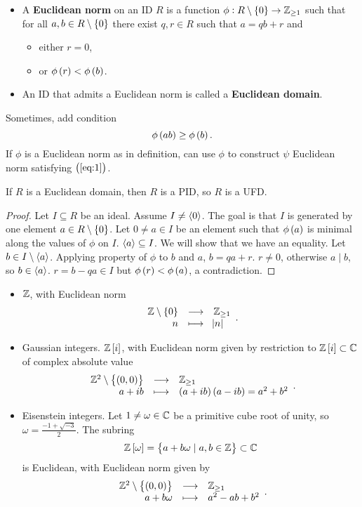 \begin{definition}
\hfill
\begin{itemize}
\item A \textbf{Euclidean norm} on an ID $ R $ is a function $ \phi : R \setminus \cbr{0} \to \Z_{\ge 1} $ such that for all $ a, b \in R \setminus \cbr{0} $ there exist $ q, r \in R $ such that $ a = qb + r $ and
\begin{itemize}
\item either $ r = 0 $,
\item or $ \phi\br{r} < \phi\br{b} $.
\end{itemize}
\item An ID that admits a Euclidean norm is called a \textbf{Euclidean domain}.
\end{itemize}
\end{definition}

Sometimes, add condition
\begin{equation}
\label{eq:1}
\phi\br{ab} \ge \phi\br{b}.
\end{equation}
If $ \phi $ is a Euclidean norm as in definition, can use $ \phi $ to construct $ \psi $ Euclidean norm satisfying $ \br{\ref{eq:1}} $.

\begin{theorem}
If $ R $ is a Euclidean domain, then $ R $ is a PID, so $ R $ is a UFD.
\end{theorem}


\begin{proof}
Let $ I \subseteq R $ be an ideal. Assume $ I \ne \left\langle 0 \right\rangle $. The goal is that $ I $ is generated by one element $ a \in R \setminus \cbr{0} $. Let $ 0 \ne a \in I $ be an element such that $ \phi\br{a} $ is minimal along the values of $ \phi $ on $ I $. $ \left\langle a \right\rangle \subseteq I $. We will show that we have an equality. Let $ b \in I \setminus \left\langle a \right\rangle $. Applying property of $ \phi $ to $ b $ and $ a $, $ b = qa + r $. $ r \ne 0 $, otherwise $ a \mid b $, so $ b \in \left\langle a \right\rangle $. $ r = b - qa \in I $ but $ \phi\br{r} < \phi\br{a} $, a contradiction.
\end{proof}

\begin{example*}
\hfill
\begin{itemize}
\item $ \mathbb{Z} $, with Euclidean norm
$$ \function{\Z \setminus \cbr{0}}{\Z_{\ge 1}}{n}{\abs{n}}. $$
\item Gaussian integers. $ \Z\sbr{i} $, with Euclidean norm given by restriction to $ \Z\sbr{i} \subset \C $ of complex absolute value
$$ \function{\Z^2 \setminus \cbr{\br{0, 0}}}{\Z_{\ge 1}}{a + ib}{\br{a + ib}\br{a - ib} = a^2 + b^2}. $$
\item Eisenstein integers. Let $ 1 \ne \omega \in \mathbb{C} $ be a primitive cube root of unity, so $ \omega = \tfrac{-1 + \sqrt{-3}}{2} $. The subring
$$ \Z\sbr{\omega} = \cbr{a + b\omega \mid a, b \in \Z} \subset \C $$
is Euclidean, with Euclidean norm given by
$$ \function{\Z^2 \setminus \cbr{\br{0, 0}}}{\Z_{\ge 1}}{a + b\omega}{a^2 - ab + b^2}. $$
\end{itemize}
\end{example*}

